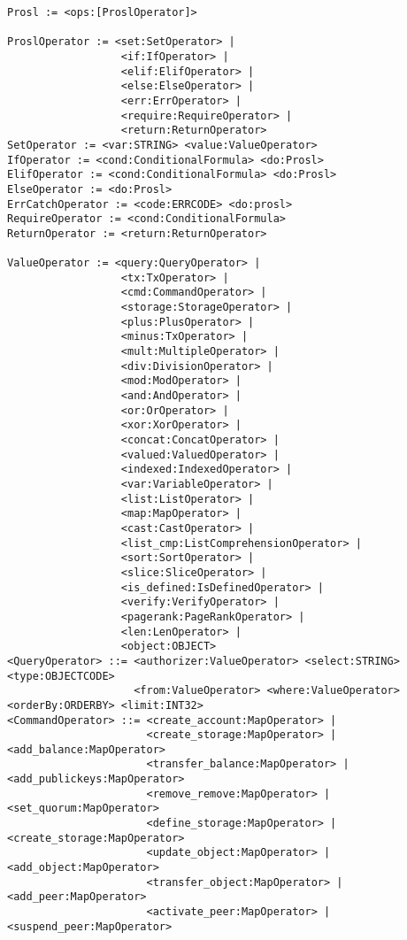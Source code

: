 \begin{verbatim}
Prosl := <ops:[ProslOperator]>

ProslOperator := <set:SetOperator> |
                  <if:IfOperator> |
                  <elif:ElifOperator> |
                  <else:ElseOperator> |
                  <err:ErrOperator> |
                  <require:RequireOperator> |
                  <return:ReturnOperator>
SetOperator := <var:STRING> <value:ValueOperator>
IfOperator := <cond:ConditionalFormula> <do:Prosl>
ElifOperator := <cond:ConditionalFormula> <do:Prosl>
ElseOperator := <do:Prosl>
ErrCatchOperator := <code:ERRCODE> <do:prosl>
RequireOperator := <cond:ConditionalFormula>
ReturnOperator := <return:ReturnOperator>

ValueOperator := <query:QueryOperator> |
                  <tx:TxOperator> |
                  <cmd:CommandOperator> |
                  <storage:StorageOperator> |
                  <plus:PlusOperator> |
                  <minus:TxOperator> |
                  <mult:MultipleOperator> |
                  <div:DivisionOperator> |
                  <mod:ModOperator> |
                  <and:AndOperator> |
                  <or:OrOperator> |
                  <xor:XorOperator> |
                  <concat:ConcatOperator> |
                  <valued:ValuedOperator> |
                  <indexed:IndexedOperator> |
                  <var:VariableOperator> |
                  <list:ListOperator> |
                  <map:MapOperator> |
                  <cast:CastOperator> |
                  <list_cmp:ListComprehensionOperator> |
                  <sort:SortOperator> |
                  <slice:SliceOperator> |
                  <is_defined:IsDefinedOperator> |
                  <verify:VerifyOperator> |
                  <pagerank:PageRankOperator> |
                  <len:LenOperator> |
                  <object:OBJECT>
<QueryOperator> ::= <authorizer:ValueOperator> <select:STRING> <type:OBJECTCODE>
                    <from:ValueOperator> <where:ValueOperator> <orderBy:ORDERBY> <limit:INT32>
<CommandOperator> ::= <create_account:MapOperator> |
                      <create_storage:MapOperator> | <add_balance:MapOperator>
                      <transfer_balance:MapOperator> | <add_publickeys:MapOperator>
                      <remove_remove:MapOperator> | <set_quorum:MapOperator>
                      <define_storage:MapOperator> | <create_storage:MapOperator>
                      <update_object:MapOperator> | <add_object:MapOperator>
                      <transfer_object:MapOperator> | <add_peer:MapOperator>
                      <activate_peer:MapOperator> | <suspend_peer:MapOperator>

\end{verbatim}

